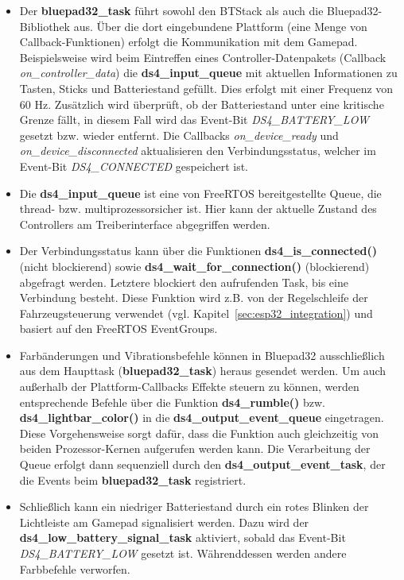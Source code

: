\begin{itemize}
    \item Der \textbf{bluepad32\_task} führt sowohl den BTStack als auch die Bluepad32-Bibliothek aus. 
    Über die dort eingebundene Plattform (eine Menge von Callback-Funktionen) erfolgt die Kommunikation mit dem Gamepad. 
    Beispielsweise wird beim Eintreffen eines Controller-Datenpakets (Callback \textit{on\_controller\_data}) die \textbf{ds4\_input\_queue} mit aktuellen Informationen zu Tasten, Sticks und Batteriestand gefüllt.
    Dies erfolgt mit einer Frequenz von 60 Hz. 
    Zusätzlich wird überprüft, ob der Batteriestand unter eine kritische Grenze fällt, in diesem Fall wird das Event-Bit \textit{DS4\_BATTERY\_LOW} gesetzt bzw. wieder entfernt. 
    Die Callbacks \textit{on\_device\_ready} und \textit{on\_device\_disconnected} aktualisieren den Verbindungsstatus, welcher im Event-Bit \textit{DS4\_CONNECTED} gespeichert ist.
     
    \item Die \textbf{ds4\_input\_queue} ist eine von FreeRTOS bereitgestellte Queue, die thread- bzw. multiprozessorsicher ist.
    Hier kann der aktuelle Zustand des Controllers am Treiberinterface abgegriffen werden.

    \item Der Verbindungsstatus kann über die Funktionen \textbf{ds4\_is\_connected()} (nicht blockierend) sowie \textbf{ds4\_wait\_for\_connection()} (blockierend) abgefragt werden. 
    Letztere blockiert den aufrufenden Task, bis eine Verbindung besteht. 
    Diese Funktion wird z.B. von der Regelschleife der Fahrzeugsteuerung verwendet (vgl. Kapitel~\ref{sec:esp32_integration}) und basiert auf den FreeRTOS EventGroups.

    \item Farbänderungen und Vibrationsbefehle können in Bluepad32 ausschließlich aus dem Haupttask (\textbf{bluepad32\_task}) heraus gesendet werden. 
    Um auch außerhalb der Plattform-Callbacks Effekte steuern zu können, werden entsprechende Befehle über die Funktion \textbf{ds4\_rumble()} bzw. \textbf{ds4\_lightbar\_color()} in die \textbf{ds4\_output\_event\_queue} eingetragen.
    Diese Vorgehensweise sorgt dafür, dass die Funktion auch gleichzeitig von beiden Prozessor-Kernen aufgerufen werden kann.
    Die Verarbeitung der Queue erfolgt dann sequenziell durch den \textbf{ds4\_output\_event\_task}, der die Events beim \textbf{bluepad32\_task} registriert.

    \item Schließlich kann ein niedriger Batteriestand durch ein rotes Blinken der Lichtleiste am Gamepad signalisiert werden. Dazu wird der \textbf{ds4\_low\_battery\_signal\_task} aktiviert, sobald das Event-Bit \textit{DS4\_BATTERY\_LOW} gesetzt ist. 
    Währenddessen werden andere Farbbefehle verworfen.
\end{itemize}

